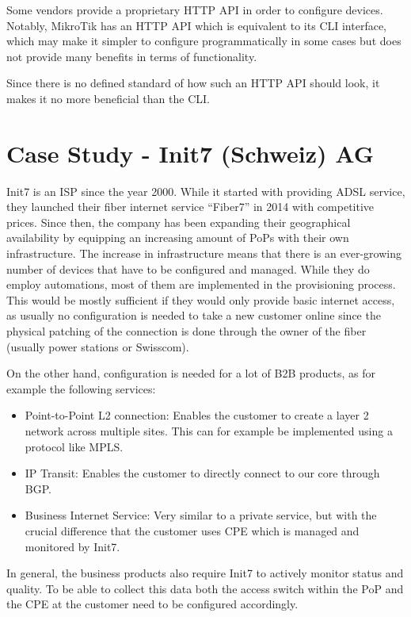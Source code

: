 Some vendors provide a proprietary HTTP API in order to configure devices.
Notably, MikroTik has an HTTP API which is equivalent to its CLI interface,
which may make it simpler to configure programmatically in some cases but
does not provide many benefits in terms of functionality.

Since there is no defined standard of how such an HTTP API should look,
it makes it no more beneficial than the CLI. 

\section{Case Study - Init7 (Schweiz) AG}

Init7 is an \acrshort{ISP} since the year 2000. While it started with providing \acrshort{ADSL} service, they launched their fiber internet service
``Fiber7'' in 2014 with competitive prices. Since then, the company has been expanding their geographical availability by
equipping an increasing amount of PoPs with their own infrastructure. The increase in infrastructure means that there is
an ever-growing number of devices that have to be configured and managed. While they do employ automations, most of them
are implemented in the provisioning process. This would be mostly sufficient if they would only provide basic internet access,
as usually no configuration is needed to take a new customer online since the physical patching of the connection is done through
the owner of the fiber (usually power stations or Swisscom).

On the other hand, configuration is needed for a lot of \acrfull{B2B} products, as for example the following services:
\begin{itemize}
    \item Point-to-Point L2 connection: Enables the customer to create a layer 2 network across multiple sites.
      This can for example be implemented using a protocol like \acrshort{MPLS}.
    \item IP Transit: Enables the customer to directly connect to our core through \acrshort{BGP}.
    \item Business Internet Service: Very similar to a private service, but with the crucial difference that the customer
       uses \acrfull{CPE} which is managed and monitored by Init7.
\end{itemize}

In general, the business products also require Init7 to actively monitor status and quality. To be able to collect this data
both the access switch within the \acrfull{PoP} and the \acrshort{CPE} at the customer need to be configured accordingly.

